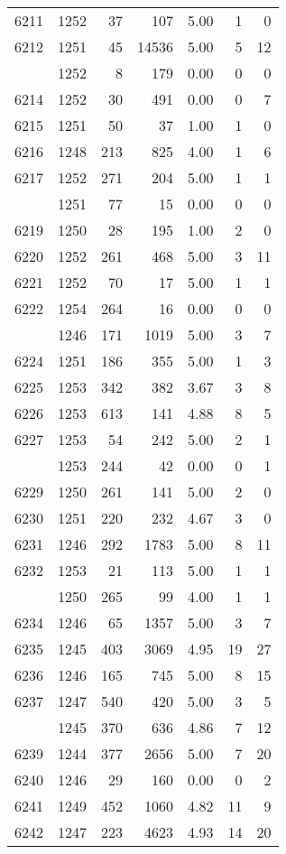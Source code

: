 \documentclass[
]{article}
\begin{document}
\begin{table}
\begin{tabular}[t]{lrrrrrr}
6211 & 1252 & 37 & 107 & 5.00 & 1 & 0\\
6212 & 1251 & 45 & 14536 & 5.00 & 5 & 12\\
\addlinespace
6213 & 1252 & 8 & 179 & 0.00 & 0 & 0\\
6214 & 1252 & 30 & 491 & 0.00 & 0 & 7\\
6215 & 1251 & 50 & 37 & 1.00 & 1 & 0\\
6216 & 1248 & 213 & 825 & 4.00 & 1 & 6\\
6217 & 1252 & 271 & 204 & 5.00 & 1 & 1\\
\addlinespace
6218 & 1251 & 77 & 15 & 0.00 & 0 & 0\\
6219 & 1250 & 28 & 195 & 1.00 & 2 & 0\\
6220 & 1252 & 261 & 468 & 5.00 & 3 & 11\\
6221 & 1252 & 70 & 17 & 5.00 & 1 & 1\\
6222 & 1254 & 264 & 16 & 0.00 & 0 & 0\\
\addlinespace
6223 & 1246 & 171 & 1019 & 5.00 & 3 & 7\\
6224 & 1251 & 186 & 355 & 5.00 & 1 & 3\\
6225 & 1253 & 342 & 382 & 3.67 & 3 & 8\\
6226 & 1253 & 613 & 141 & 4.88 & 8 & 5\\
6227 & 1253 & 54 & 242 & 5.00 & 2 & 1\\
\addlinespace
6228 & 1253 & 244 & 42 & 0.00 & 0 & 1\\
6229 & 1250 & 261 & 141 & 5.00 & 2 & 0\\
6230 & 1251 & 220 & 232 & 4.67 & 3 & 0\\
6231 & 1246 & 292 & 1783 & 5.00 & 8 & 11\\
6232 & 1253 & 21 & 113 & 5.00 & 1 & 1\\
\addlinespace
6233 & 1250 & 265 & 99 & 4.00 & 1 & 1\\
6234 & 1246 & 65 & 1357 & 5.00 & 3 & 7\\
6235 & 1245 & 403 & 3069 & 4.95 & 19 & 27\\
6236 & 1246 & 165 & 745 & 5.00 & 8 & 15\\
6237 & 1247 & 540 & 420 & 5.00 & 3 & 5\\
\addlinespace
6238 & 1245 & 370 & 636 & 4.86 & 7 & 12\\
6239 & 1244 & 377 & 2656 & 5.00 & 7 & 20\\
6240 & 1246 & 29 & 160 & 0.00 & 0 & 2\\
6241 & 1249 & 452 & 1060 & 4.82 & 11 & 9\\
6242 & 1247 & 223 & 4623 & 4.93 & 14 & 20\\

\end{tabular}
\end{table}
\end{document}
